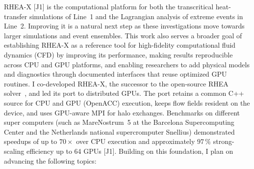\documentclass[11pt]{article}
\begin{document}
RHEA-X [J1] is the computational platform for both the transcritical heat-transfer simulations of Line~1 and the Lagrangian analysis of extreme events in Line~2. Improving it is a natural next step as these investigations move towards larger simulations and event ensembles. 
This work also serves a broader goal of establishing RHEA-X as a reference tool for high-fidelity computational fluid dynamics (CFD) by improving its performance, making results reproducible across CPU and GPU platforms, and enabling researchers to add physical models and diagnostics through documented interfaces that reuse optimized GPU routines.
I co-developed RHEA-X, the successor to the open-source RHEA solver~\cite{RHEASoftware}, and led its port to distributed GPUs. The port retains a common C++ source for CPU and GPU (OpenACC) execution, keeps flow fields resident on the device, and uses GPU-aware MPI for halo exchanges. 
Benchmarks on different super computers (such as MareNostrum~5 at the Barcelona Supercomputing Center and the Netherlands national supercromputer Snellius) demonstrated speedups of up to $70\times$ over CPU execution and approximately $97\,\%$ strong-scaling efficiency up to 64 GPUs [J1]. 
Building on this foundation, I plan on advancing the following topics:
\end{document}
